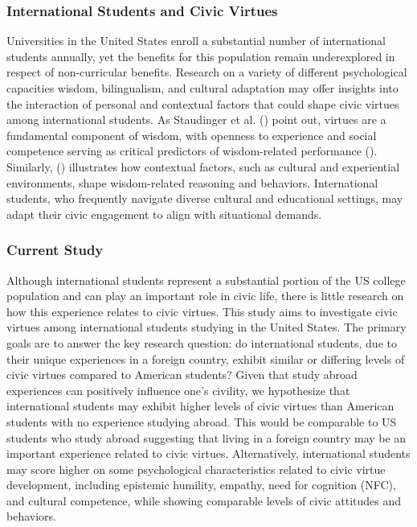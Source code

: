 \documentclass[
  man,
  floatsintext,
  longtable,
  nolmodern,
  notxfonts,
  notimes,
  colorlinks=true,linkcolor=blue,citecolor=blue,urlcolor=blue]{apa7}
\begin{document}
\subsubsection{International Students and Civic
Virtues}\label{international-students-and-civic-virtues}

Universities in the United States enroll a substantial number of
international students annually, yet the benefits for this population
remain underexplored in respect of non-curricular benefits. Research on
a variety of different psychological capacities wisdom, bilingualism,
and cultural adaptation may offer insights into the interaction of
personal and contextual factors that could shape civic virtues among
international students. As Staudinger et al.
() point
out, virtues are a fundamental component of wisdom, with openness to
experience and social competence serving as critical predictors of
wisdom-related performance
().
Similarly, ()
illustrates how contextual factors, such as cultural and experiential
environments, shape wisdom-related reasoning and behaviors.
International students, who frequently navigate diverse cultural and
educational settings, may adapt their civic engagement to align with
situational demands.

\subsubsection{Current Study}\label{current-study}

Although international students represent a substantial portion of the
US college population and can play an important role in civic life,
there is little research on how this experience relates to civic
virtues. This study aims to investigate civic virtues among
international students studying in the United States. The primary goals
are to answer the key research question: do international students, due
to their unique experiences in a foreign country, exhibit similar or
differing levels of civic virtues compared to American students? Given
that study abroad experiences can positively influence one's civility,
we hypothesize that international students may exhibit higher levels of
civic virtues than American students with no experience studying abroad.
This would be comparable to US students who study abroad suggesting that
living in a foreign country may be an important experience related to
civic virtues. Alternatively, international students may score higher on
some psychological characteristics related to civic virtue development,
including epistemic humility, empathy, need for cognition (NFC), and
cultural competence, while showing comparable levels of civic attitudes
and behaviors.
\end{document}
